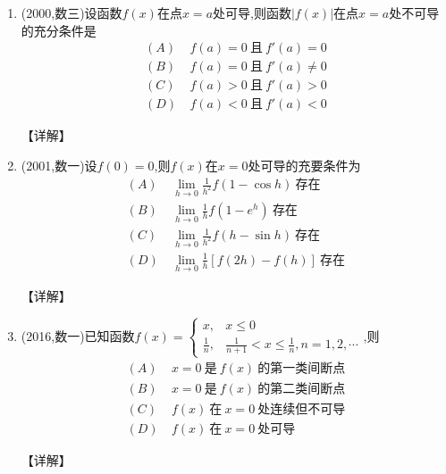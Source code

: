 \documentclass[12pt, a4paper, oneside, UTF8]{ctexbook}
\begin{document}
\begin{enumerate}[label=\arabic*.]
    \item (2000,数三)设函数$f(x)$在点$x=a$处可导,则函数$|f(x)|$在点$x=a$处不可导的充分条件是
    \begin{align*}
        (A)&\ f(a)=0\ \text{且}\ f'(a)=0 \\
        (B)&\ f(a)=0\ \text{且}\ f'(a)\neq0 \\
        (C)&\ f(a)>0\ \text{且}\ f'(a)>0 \\
        (D)&\ f(a)<0\ \text{且}\ f'(a)<0
    \end{align*}
    
    \begin{solution}
    【详解】
    \end{solution}
    
    \item (2001,数一)设$f(0)=0$,则$f(x)$在$x=0$处可导的充要条件为
    \begin{align*}
        (A)&\ \lim_{h\to0}\frac{1}{h^2}f(1-\cos h)\ \text{存在} \\
        (B)&\ \lim_{h\to0}\frac{1}{h}f(1-e^h)\ \text{存在} \\
        (C)&\ \lim_{h\to0}\frac{1}{h^2}f(h-\sin h)\ \text{存在} \\
        (D)&\ \lim_{h\to0}\frac{1}{h}[f(2h)-f(h)]\ \text{存在}
    \end{align*}
    
    \begin{solution}
    【详解】
    \end{solution}
    
    \item (2016,数一)已知函数$f(x)=\begin{cases}
        x, & x\leq0 \\
        \frac{1}{n}, & \frac{1}{n+1}<x\leq\frac{1}{n},n=1,2,\cdots
    \end{cases}$,则
    \begin{align*}
        (A)&\ x=0\ \text{是}\ f(x)\ \text{的第一类间断点} \\
        (B)&\ x=0\ \text{是}\ f(x)\ \text{的第二类间断点} \\
        (C)&\ f(x)\ \text{在}\ x=0\ \text{处连续但不可导} \\
        (D)&\ f(x)\ \text{在}\ x=0\ \text{处可导}
    \end{align*}
    
    \begin{solution}
    【详解】
    \end{solution}
\end{enumerate}
\end{document}
